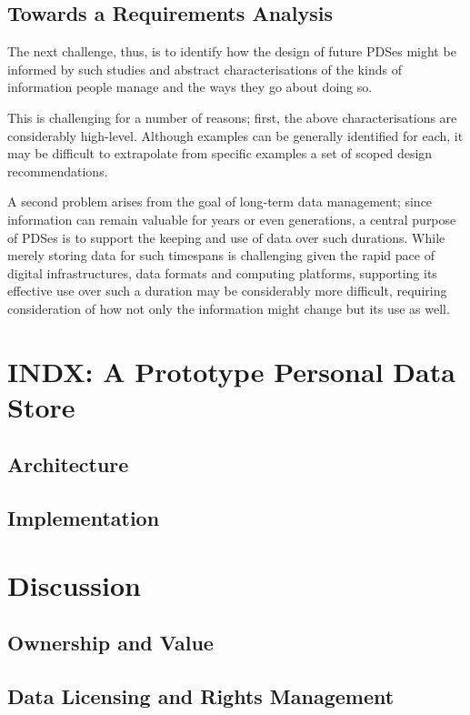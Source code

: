 \documentclass[runningheads,a4paper]{llncs}
\begin{document}
\subsection{Towards a Requirements Analysis}

The next challenge, thus, is to identify how the design of future PDSes might be informed by such studies and abstract characterisations of the kinds of information people manage and the ways they go about doing so.  

This is challenging for a number of reasons; first, the above characterisations are considerably high-level.  Although examples can be generally identified for each, it may be difficult to extrapolate from specific examples a set of scoped design recommendations.

A second problem arises from the goal of long-term data management; since information can remain valuable for years or even generations, a central purpose of PDSes is to support the keeping and use of data over such durations.  While merely storing data for such timespans is challenging given the rapid pace of digital infrastructures, data formats and computing platforms, supporting its effective use over such a duration may be considerably more difficult, requiring consideration of how not only the information might change but its use as well.

\section{INDX: A Prototype Personal Data Store}

\subsection{Architecture}

\subsection{Implementation}

\section{Discussion}

\subsection{Ownership and Value}

\subsection{Data Licensing and Rights Management}
\end{document}
